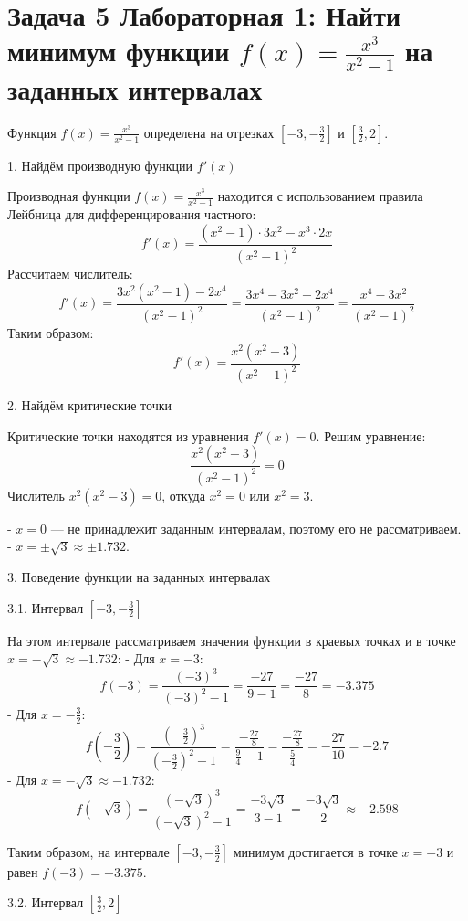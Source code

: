\documentclass[a4paper,12pt]{article}
\begin{document}
\section*{Задача 5 Лабораторная 1: Найти минимум функции \( f(x) = \frac{x^3}{x^2 - 1} \) на заданных интервалах}

Функция \( f(x) = \frac{x^3}{x^2 - 1} \) определена на отрезках \( \left[ -3, -\frac{3}{2} \right] \) и \( \left[ \frac{3}{2}, 2 \right] \). 

1. Найдём производную функции \( f'(x) \)

Производная функции \( f(x) = \frac{x^3}{x^2 - 1} \) находится с использованием правила Лейбница для дифференцирования частного:
\[
f'(x) = \frac{(x^2 - 1) \cdot 3x^2 - x^3 \cdot 2x}{(x^2 - 1)^2}
\]
Рассчитаем числитель:
\[
f'(x) = \frac{3x^2(x^2 - 1) - 2x^4}{(x^2 - 1)^2} = \frac{3x^4 - 3x^2 - 2x^4}{(x^2 - 1)^2} = \frac{x^4 - 3x^2}{(x^2 - 1)^2}
\]
Таким образом:
\[
f'(x) = \frac{x^2(x^2 - 3)}{(x^2 - 1)^2}
\]

2. Найдём критические точки

Критические точки находятся из уравнения \( f'(x) = 0 \). Решим уравнение:
\[
\frac{x^2(x^2 - 3)}{(x^2 - 1)^2} = 0
\]
Числитель \( x^2(x^2 - 3) = 0 \), откуда \( x^2 = 0 \) или \( x^2 = 3 \).

- \( x = 0 \) — не принадлежит заданным интервалам, поэтому его не рассматриваем.
- \( x = \pm \sqrt{3} \approx \pm 1.732 \).

3. Поведение функции на заданных интервалах

3.1. Интервал \( \left[ -3, -\frac{3}{2} \right] \)

На этом интервале рассматриваем значения функции в краевых точках и в точке \( x = -\sqrt{3} \approx -1.732 \):
- Для \( x = -3 \):
\[
f(-3) = \frac{(-3)^3}{(-3)^2 - 1} = \frac{-27}{9 - 1} = \frac{-27}{8} = -3.375
\]
- Для \( x = -\frac{3}{2} \):
\[
f\left( -\frac{3}{2} \right) = \frac{\left( -\frac{3}{2} \right)^3}{\left( -\frac{3}{2} \right)^2 - 1} = \frac{-\frac{27}{8}}{\frac{9}{4} - 1} = \frac{-\frac{27}{8}}{\frac{5}{4}} = -\frac{27}{10} = -2.7
\]
- Для \( x = -\sqrt{3} \approx -1.732 \):
\[
f(-\sqrt{3}) = \frac{(-\sqrt{3})^3}{(-\sqrt{3})^2 - 1} = \frac{-3\sqrt{3}}{3 - 1} = \frac{-3\sqrt{3}}{2} \approx -2.598
\]

Таким образом, на интервале \( \left[ -3, -\frac{3}{2} \right] \) минимум достигается в точке \( x = -3 \) и равен \( f(-3) = -3.375 \).

3.2. Интервал \( \left[ \frac{3}{2}, 2 \right] \)
\end{document}
